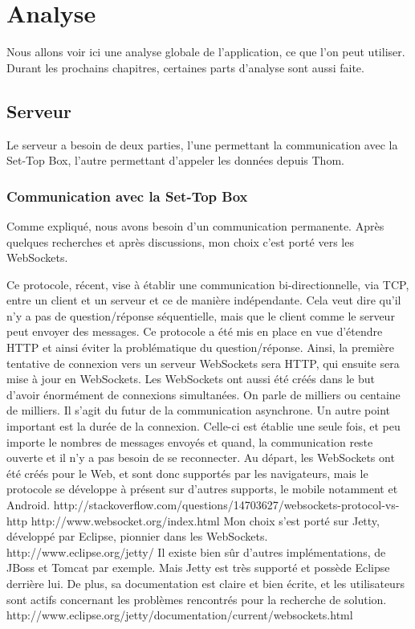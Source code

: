 \documentclass[a4paper, 12pt, svgnames]{report}
\begin{document}
	\chapter{Analyse}
	Nous allons voir ici une analyse globale de l'application, ce que l'on peut utiliser. Durant les prochains chapitres, certaines parts d'analyse sont aussi faite.
	\section{Serveur}
	Le serveur a besoin de deux parties, l'une permettant la communication avec la Set-Top Box, l'autre permettant d'appeler les données depuis Thom.
	\subsection{Communication avec la Set-Top Box}
	Comme expliqué, nous avons besoin d'un communication permanente. Après quelques recherches et après discussions, mon choix c'est porté vers les WebSockets.

\medskip
Ce protocole, récent, vise à établir une communication bi-directionnelle, via TCP, entre un client et un serveur et ce de manière indépendante. Cela veut dire qu'il n'y a pas de question/réponse séquentielle, mais que le client comme le serveur peut envoyer des messages.
\medskip
Ce protocole a été mis en place en vue d'étendre HTTP et ainsi éviter la problématique du question/réponse. Ainsi, la première tentative de connexion vers un serveur WebSockets sera HTTP, qui ensuite sera mise à jour en WebSockets.
\medskip
Les WebSockets ont aussi été créés dans le but d'avoir énormément de connexions simultanées. On parle de milliers ou centaine de milliers. Il s'agit du futur de la communication asynchrone. Un autre point important est la durée de la connexion. Celle-ci est établie une seule fois, et peu importe le nombres de messages envoyés et quand, la communication reste ouverte et il n'y a pas besoin de se reconnecter.
\medskip
Au départ, les WebSockets ont été créés pour le Web, et sont donc supportés par les navigateurs, mais le protocole se développe à présent sur d'autres supports, le mobile notamment et Android.
\medskip
http://stackoverflow.com/questions/14703627/websockets-protocol-vs-http
http://www.websocket.org/index.html
\medskip
Mon choix s'est porté sur Jetty, développé par Eclipse, pionnier dans les WebSockets.
http://www.eclipse.org/jetty/
\medskip
Il existe bien sûr d'autres implémentations, de JBoss et Tomcat par exemple. Mais Jetty est très supporté et possède Eclipse derrière lui. De plus, sa documentation est claire et bien écrite, et les utilisateurs sont actifs concernant les problèmes rencontrés pour la recherche de solution.
http://www.eclipse.org/jetty/documentation/current/websockets.html
\end{document}
